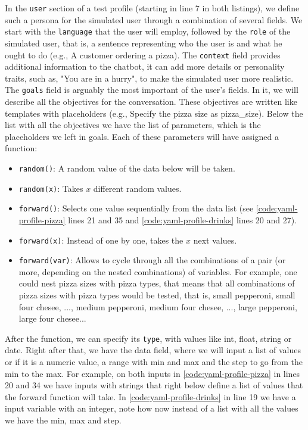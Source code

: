 In the \texttt{user} section of a test profile
(starting in line 7 in both listings),
we define such a persona for the simulated user
through a combination of several fields.
We start with the \texttt{language} that the user will employ,
followed by the \texttt{role} of the simulated user,
that is, a sentence representing who the user is
and what he ought to do (e.g., A customer ordering a pizza).
The \texttt{context} field provides additional information to the chatbot,
it can add more details or personality traits, such as,
"You are in a hurry", to make the simulated user more realistic.
The \texttt{goals} field is arguably the most important of the user's fields.
In it, we will describe all the objectives for the conversation.
These objectives are written like templates with placeholders
(e.g., Specify the pizza size as {{pizza\_size}}).
Below the list with all the objectives
we have the list of parameters, which is the placeholders we left in goals.
Each of these parameters will have assigned a function:
\begin{itemize}
  \item \texttt{random()}: A random value of the data below will be taken.
  \item \texttt{random(x)}: Takes $x$ different random values.
  \item \texttt{forward()}: Selects one value sequentially from the data list
    (see \autoref{code:yaml-profile-pizza} lines 21 and 35
    and \autoref{code:yaml-profile-drinks} lines 20 and 27).
  \item \texttt{forward(x)}: Instead of one by one, takes the $x$ next values.
  \item \texttt{forward(var)}:
    Allows to cycle through all the combinations of a pair (or more, depending on the nested combinations) of variables.
    For example, one could nest pizza sizes with pizza types,
    that means that all combinations of pizza sizes with pizza types would be tested,
    that is, small pepperoni, small four chesee, ..., medium pepperoni, medium four chesee, ..., large pepperoni, large four chesee...
\end{itemize}
After the function, we can specify its \texttt{type},
with values like int, float, string or date.
Right after that, we have the data field,
where we will input a list of values
or if it is a numeric value, a range with min and max
and the step to go from the min to the max.
For example, on both inputs in \autoref{code:yaml-profile-pizza}
in lines 20 and 34 we have inputs with strings
that right below define a list of values that
the forward function will take.
In \autoref{code:yaml-profile-drinks} in line 19
we have a input variable with an integer,
note how now instead of a list with all the values
we have the min, max and step.


